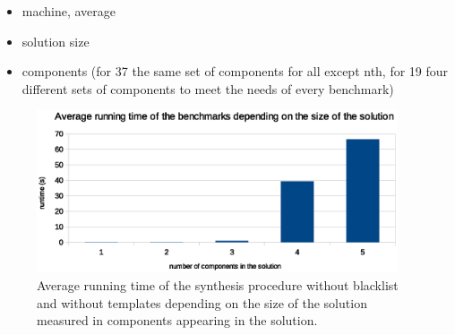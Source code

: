 \begin{itemize}
\item machine, average
\item solution size
\item components (for 37 the same set of components for all except nth, for 19 four different sets of components to meet the needs of every benchmark)
\end{itemize}


\begin{figure}[p]
    \centering
    \includegraphics[width=0.95\textwidth]{nof_comp_vs_runtime.eps}
    \caption{Average running time of the synthesis procedure without blacklist and without templates depending on the size of the solution measured in components appearing in the solution.}
    \label{fig:nof_comp_vs_runtime}
\end{figure}



